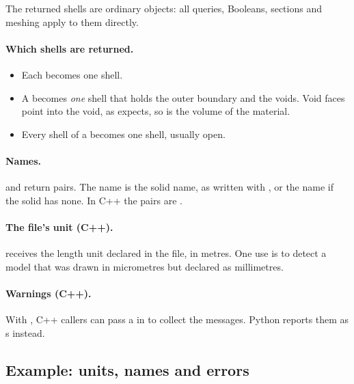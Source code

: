 The returned shells are ordinary \NF{} objects: all queries, Booleans, sections and meshing
apply to them directly.

\paragraph{Which shells are returned.}
\begin{itemize}
  \item Each  becomes one shell.
  \item A  becomes \emph{one} shell that holds the outer boundary and the
    voids. Void faces point into the void, as  expects, so
     is the volume of the material.
  \item Every shell of a  becomes one shell, usually open.
\end{itemize}

\paragraph{Names.}  and  return 
pairs. The name is the solid name, as written with , or the 
name if the solid has none. In C++ the pairs are .

\paragraph{The file's unit (C++).}  receives the length
unit declared in the file, in metres. One use is to detect a model that was drawn in
micrometres but declared as millimetres.

{\raggedright \paragraph{Warnings (C++).} With , C++ callers can pass a
 in  to collect the messages.
Python reports them as s instead.\par}

\subsection{Example: units, names and errors}

